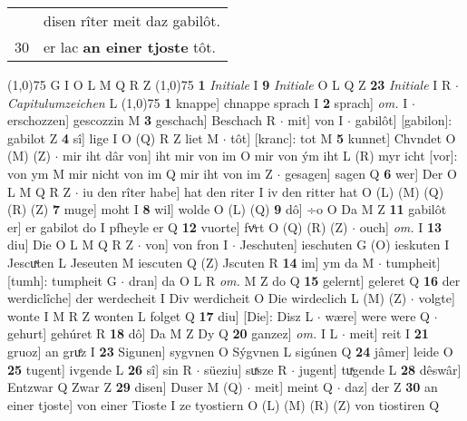 \documentclass[8pt,a4paper,notitlepage]{article}
\begin{document}
\begin{table}[ht]
\begin{minipage}[t]{0.5\linewidth}
\begin{tabular}{rl}
 & disen rîter meit daz gabilôt.\\ 
30 & er lac \textbf{an einer tjoste} tôt.\\ 
\end{tabular}
\scriptsize
\line(1,0){75} \newline
G I O L M Q R Z \newline
\line(1,0){75} \newline
\textbf{1} \textit{Initiale} I  \textbf{9} \textit{Initiale} O L Q Z  \textbf{23} \textit{Initiale} I R   $\cdot$ \textit{Capitulumzeichen} L  \newline
\line(1,0){75} \newline
\textbf{1} knappe] chnappe sprach I \textbf{2} sprach] \textit{om.} I  $\cdot$ erschozzen] gescozzin M \textbf{3} geschach] Beschach R  $\cdot$ mit] von I  $\cdot$ gabilôt] [gabilon]: gabilot Z \textbf{4} sî] lige I O (Q) R Z liet M  $\cdot$ tôt] [kranc]: tot M \textbf{5} kunnet] Chvndet O (M) (Z)  $\cdot$ mir iht dâr von] iht mir von im O mir von ým iht L (R) myr icht [vor]: von ym M mir nicht von im Q mir iht von im Z  $\cdot$ gesagen] sagen Q \textbf{6} wer] Der O L M Q R Z  $\cdot$ iu den rîter habe] hat den riter I iv den ritter hat O (L) (M) (Q) (R) (Z) \textbf{7} muge] moht I \textbf{8} wil] wolde O (L) (Q) \textbf{9} dô] ÷o O Da M Z \textbf{11} gabilôt er] er gabilot do I pfheyle er Q \textbf{12} vuorte] fvͤrt O (Q) (R) (Z)  $\cdot$ ouch] \textit{om.} I \textbf{13} diu] Die O L M Q R Z  $\cdot$ von] von fron I  $\cdot$ Jeschuten] ieschuten G (O) ieskuten I Jescuͯten L Jeseuten M iescuten Q (Z) Jscuten R \textbf{14} im] ym da M  $\cdot$ tumpheit] [tumh]: tumpheit G  $\cdot$ dran] da O L R \textit{om.} M Z do Q \textbf{15} gelernt] geleret Q \textbf{16} der werdiclîche] der werdecheit I Div werdicheit O Die wirdeclich L (M) (Z)  $\cdot$ volgte] wonte I M R Z wonten L folget Q \textbf{17} diu] [Die]: Disz L  $\cdot$ wære] were were Q  $\cdot$ gehurt] gehúret R \textbf{18} dô] Da M Z Dy Q \textbf{20} ganzez] \textit{om.} I L  $\cdot$ meit] reit I \textbf{21} gruoz] an gruͤz I \textbf{23} Sigunen] sygvnen O Sýgvnen L sigúnen Q \textbf{24} jâmer] leide O \textbf{25} tugent] ivgende L \textbf{26} sî] sin R  $\cdot$ süeziu] suͯsze R  $\cdot$ jugent] tuͯgende L \textbf{28} dêswâr] Entzwar Q Zwar Z \textbf{29} disen] Duser M (Q)  $\cdot$ meit] meint Q  $\cdot$ daz] der Z \textbf{30} an einer tjoste] von einer Tioste I ze tyostiern O (L) (M) (R) (Z) von tiostiren Q \newline
\end{minipage}
\hspace{0.5cm}

\end{table}
\end{document}
